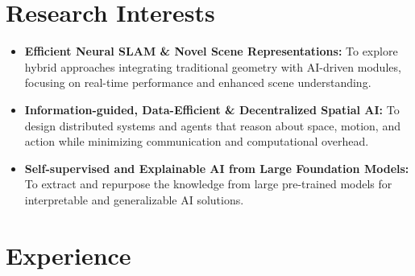 \documentclass[11pt,a4paper,sans]{moderncv} %
\begin{document}
\section{Research Interests}
\begin{itemize}

	\item \textbf{Efficient Neural SLAM \& Novel Scene Representations:}
	{\small To explore hybrid approaches integrating traditional geometry with AI-driven modules, focusing on real-time performance and enhanced scene understanding.}
	
	
	\item \textbf{Information-guided, Data-Efficient \& Decentralized Spatial AI:} {\small To design distributed systems and agents that reason about space, motion, and action while minimizing communication and computational overhead.} %
	\item \textbf{Self-supervised and Explainable AI from Large Foundation Models:} {\small To extract and repurpose the knowledge from large pre-trained models for interpretable and generalizable AI solutions.}	
\end{itemize}

\section{Experience}

\newcommand*{\customcventry}[7][.25em]{%
	\cvitem[#1]{#2}{%
		{\bfseries#3}%
		\ifthenelse{\equal{#4}{}}{}{, {\slshape#4}}%
		\ifthenelse{\equal{#5}{}}{}{, #5}%
		\ifthenelse{\equal{#6}{}}{}{, #6}%
		\ifthenelse{\equal{#3#4#5#6}{}}{}{.\strut}%
		\ifx&#7&%
		\else{\ifthenelse{\equal{#3#4#5#6}{}}{}{\newline{}}\begin{minipage}[t]{\linewidth}\small#7\end{minipage}}\fi}}



\end{document}
